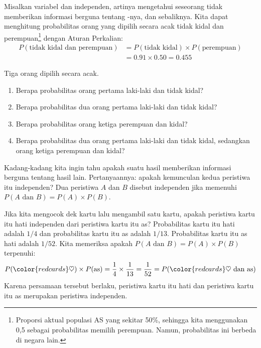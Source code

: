 Misalkan variabel  dan
 independen,
artinya mengetahui  seseorang tidak memberikan informasi
berguna tentang -nya, dan sebaliknya.
Kita dapat menghitung probabilitas orang yang dipilih secara acak
tidak kidal dan perempuan\footnote{Proporsi aktual
  populasi AS yang  sekitar 50\%,
  sehingga kita menggunakan 0,5 sebagai probabilitas memilih perempuan.
  Namun, probabilitas ini berbeda di negara lain.}
dengan Aturan Perkalian:
\begin{align*}
P(\text{tidak kidal dan perempuan})
    &= P(\text{tidak kidal}) \times  P(\text{perempuan}) \\
    &= 0.91 \times  0.50 = 0.455
\end{align*}


\begin{exercisewrap}
\begin{nexercise}
Tiga orang dipilih secara acak.\footnotemark \vspace{-1.5mm}
\begin{enumerate}
\setlength{\itemsep}{0mm}
\item[(a)] Berapa probabilitas orang pertama laki-laki dan tidak kidal?
\item[(b)] Berapa probabilitas dua orang pertama laki-laki dan tidak kidal?
\item[(c)] Berapa probabilitas orang ketiga perempuan dan kidal?
\item[(d)] Berapa probabilitas dua orang pertama laki-laki dan tidak kidal, sedangkan orang ketiga perempuan dan kidal?
\end{enumerate}
\end{nexercise}
\end{exercisewrap}

Kadang-kadang kita ingin tahu apakah suatu hasil memberikan informasi berguna tentang hasil lain. Pertanyaannya: apakah kemunculan kedua peristiwa itu independen? Dua peristiwa $A$ dan $B$ disebut independen jika memenuhi
$P(A \text{ dan }B) = P(A) \times  P(B)$.

\begin{examplewrap}
\begin{nexample}{Jika kita mengocok dek kartu lalu mengambil satu kartu, apakah peristiwa kartu itu hati independen dari peristiwa kartu itu as?}
Probabilitas kartu itu hati adalah $1/4$ dan probabilitas kartu itu as adalah $1/13$. Probabilitas kartu itu as hati adalah $1/52$.
Kita memeriksa apakah $P(A \text{ dan }B) = P(A) \times  P(B)$
terpenuhi:
\begin{align*}
P({\color{redcards}\heartsuit})\times P(\text{as}) = \frac{1}{4}\times \frac{1}{13} = \frac{1}{52} 
					= P({\color{redcards}\heartsuit}\text{ dan as})
\end{align*}
Karena persamaan tersebut berlaku, peristiwa kartu itu hati dan peristiwa kartu itu as merupakan peristiwa independen.
\end{nexample}
\end{examplewrap}

